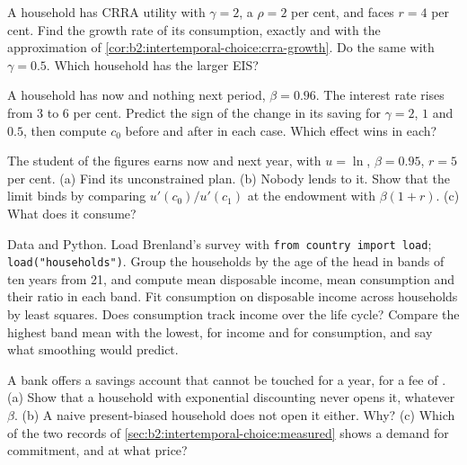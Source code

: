 \begin{exercise}[$\star\star$]\label{exo:b2:intertemporal-choice:5}
A household has CRRA utility with $\gamma = 2$, a  $\rho = 2$ per cent, and
faces $r = 4$ per cent. Find the growth rate of its consumption, exactly and with the approximation of
\cref{cor:b2:intertemporal-choice:crra-growth}. Do the same with $\gamma = 0.5$. Which household has
the larger EIS?
\end{exercise}

\begin{exercise}[$\star\star$]\label{exo:b2:intertemporal-choice:6}
A household has  now and nothing next period, $\beta = 0.96$. The interest rate rises from
3 to 6 per cent. Predict the sign of the change in its saving for $\gamma = 2$, $1$ and $0.5$, then
compute $c_0$ before and after in each case. Which effect wins in each?
\end{exercise}

\begin{exercise}[$\star\star$]\label{exo:b2:intertemporal-choice:7}
The student of the figures earns  now and  next year, with $u = \ln$, $\beta =
0.95$, $r = 5$ per cent. (a) Find its unconstrained plan. (b) Nobody lends to it. Show that the limit
binds by comparing $u'(c_0)/u'(c_1)$ at the endowment with $\beta(1 + r)$. (c) What does it consume?
\end{exercise}

\begin{exercise}[$\star\star$]\label{exo:b2:intertemporal-choice:8}
Data and Python. Load Brenland's survey with \texttt{from country import load};
\texttt{load("households")}. Group the households by the age of the head in bands of ten years from 21,
and compute mean disposable income, mean consumption and their ratio in each band. Fit consumption on
disposable income across households by least squares. Does consumption track income over the life
cycle? Compare the highest band mean with the lowest, for income and for consumption, and say what
smoothing would predict.
\end{exercise}

\begin{exercise}[$\star\star$]\label{exo:b2:intertemporal-choice:9}
A bank offers a savings account that cannot be touched for a year, for a fee of . (a) Show that
a household with exponential discounting never opens it, whatever $\beta$. (b) A naive present-biased
household does not open it either. Why? (c) Which of the two records of
\cref{sec:b2:intertemporal-choice:measured} shows a demand for commitment, and at what price?
\end{exercise}

